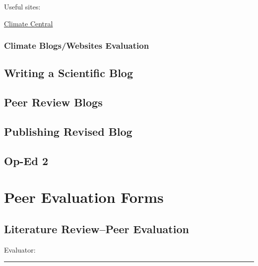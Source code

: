 \documentclass{article}\usepackage[]{graphicx}\usepackage[]{color}
\newenvironment{itemize*}%
  {\begin{itemize}%
    \setlength{\itemsep}{0pt}%
    \setlength{\parskip}{0pt}}%
  {\end{itemize}}
\begin{document}
Useful sites: 

\begin{itemize*}
  \item \href{http://www.climatecentral.org/news/the-heat-is-on}{Climate Central}
  \item 
\end{itemize*}

\subsubsection{Climate Blogs/Websites Evaluation}



\subsection{Writing a Scientific Blog}



\subsection{Peer Review Blogs}



\subsection{Publishing Revised Blog}



\subsection{Op-Ed 2}



\clearpage
\newpage
\section{Peer Evaluation Forms}

\subsection{Literature Review--Peer Evaluation}

\bigskip
Evaluator: \rule{7cm}{0.4pt}

\bigskip
\end{document}
